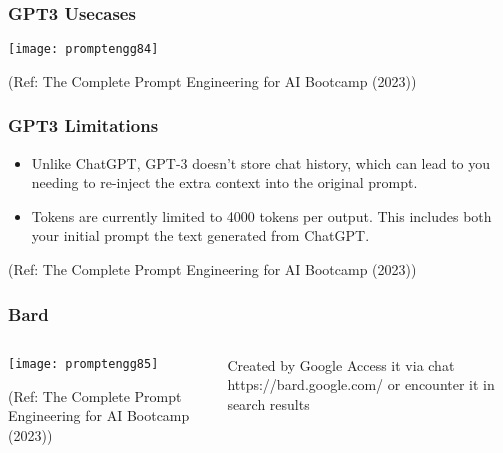 \begin{frame}[fragile]\frametitle{GPT3 Usecases}


		\begin{center}
		\texttt{[image: promptengg84]}

		{\tiny (Ref: The Complete Prompt Engineering for AI Bootcamp (2023))}
		\end{center}	

\end{frame}

\begin{frame}[fragile]\frametitle{GPT3 Limitations}




\begin{itemize}
\item  Unlike ChatGPT, GPT-3 doesn’t store chat history, which can lead to you needing to re-inject the extra context into the
original prompt.
\item Tokens are currently limited to 4000 tokens per output. This includes both your initial prompt the text generated
from ChatGPT.

\end{itemize}	 

{\tiny (Ref: The Complete Prompt Engineering for AI Bootcamp (2023))}

\end{frame}


\begin{frame}[fragile]\frametitle{Bard}


\begin{columns}
    \begin{column}[T]{0.6\linewidth}
		\begin{center}
		\texttt{[image: promptengg85]}

		{\tiny (Ref: The Complete Prompt Engineering for AI Bootcamp (2023))}
		\end{center}	
    \end{column}
    \begin{column}[T]{0.4\linewidth}
		Created by Google
		Access it via chat https://bard.google.com/ or encounter it in search results
    \end{column}
  \end{columns}
\end{frame}

